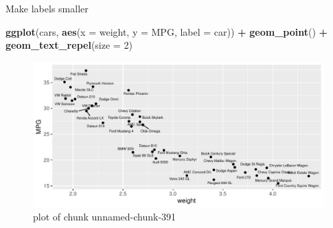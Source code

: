\documentclass[ignorenonframetext,]{beamer}
\newenvironment{Shaded}{\begin{snugshade}}{\end{snugshade}}
\newcommand{\DataTypeTok}[1]{\textcolor[rgb]{0.13,0.29,0.53}{#1}}
\newcommand{\DecValTok}[1]{\textcolor[rgb]{0.00,0.00,0.81}{#1}}
\newcommand{\KeywordTok}[1]{\textcolor[rgb]{0.13,0.29,0.53}{\textbf{#1}}}
\newcommand{\NormalTok}[1]{#1}
\newcommand{\OperatorTok}[1]{\textcolor[rgb]{0.81,0.36,0.00}{\textbf{#1}}}
\newcommand{\StringTok}[1]{\textcolor[rgb]{0.31,0.60,0.02}{#1}}
\begin{document}
\begin{frame}[fragile]{Make labels smaller}
\protect\hypertarget{make-labels-smaller}{}

\begin{Shaded}
\begin{Highlighting}[]
\KeywordTok{ggplot}\NormalTok{(cars, }\KeywordTok{aes}\NormalTok{(}\DataTypeTok{x =}\NormalTok{ weight, }\DataTypeTok{y =}\NormalTok{ MPG, }\DataTypeTok{label =}\NormalTok{ car)) }\OperatorTok{+}
\StringTok{  }\KeywordTok{geom_point}\NormalTok{() }\OperatorTok{+}\StringTok{ }\KeywordTok{geom_text_repel}\NormalTok{(}\DataTypeTok{size =} \DecValTok{2}\NormalTok{)}
\end{Highlighting}
\end{Shaded}

\begin{figure}
\centering
\includegraphics{figure/unnamed-chunk-391-1.pdf}
\caption{plot of chunk unnamed-chunk-391}
\end{figure}

\end{frame}
\end{document}
